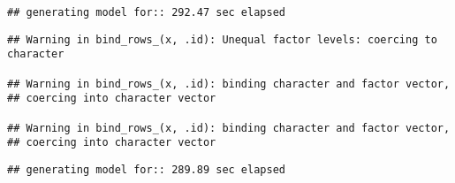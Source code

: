 \documentclass[]{article}
\begin{document}
\begin{verbatim}
## generating model for:: 292.47 sec elapsed
\end{verbatim}

\begin{verbatim}
## Warning in bind_rows_(x, .id): Unequal factor levels: coercing to character

## Warning in bind_rows_(x, .id): binding character and factor vector,
## coercing into character vector

## Warning in bind_rows_(x, .id): binding character and factor vector,
## coercing into character vector
\end{verbatim}

\begin{verbatim}
## generating model for:: 289.89 sec elapsed
\end{verbatim}
\end{document}
